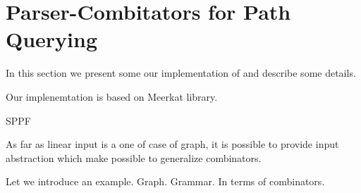 \section{Parser-Combitators for Path Querying}

In this section we present some our implementation of and describe some details.

Our implenemtation is based on Meerkat library.

SPPF

As far as linear input is a one of case of graph, it is possible to provide input abstraction which 
make possible to generalize combinators.

Let we introduce an example. 
Graph.
Grammar.
In terms of combinators.

